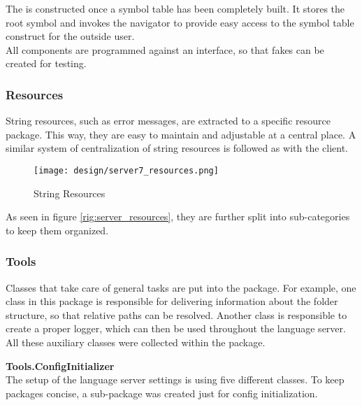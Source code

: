 The  is constructed once a symbol table has been completely built.
It stores the root symbol and invokes the navigator to provide easy access to the symbol table construct for the outside user.\\

All components are programmed against an interface, so that fakes can be created for testing.\\

\subsubsection{Resources}
String resources, such as error messages, are extracted to a specific resource package.
This way, they are easy to maintain and adjustable at a central place.
A similar system of centralization of string resources is followed as with the client.

\begin{figure}[h]
    \centering
    \texttt{[image: design/server7\_resources.png]}
    \caption{String Resources}
    \label{fig:server_resources}
\end{figure}

As seen in figure \ref{rig:server_resources}, they are further split into sub-categories to keep them organized.


\subsubsection{Tools}
Classes that take care of general tasks are put into the  package.
For example, one class in this package is responsible for delivering information about the folder structure, so that relative paths can be resolved.
Another class is responsible to create a proper logger, which can then be used throughout the language server.
All these auxiliary classes were collected within the  package.

\textbf{Tools.ConfigInitializer}\\

The setup of the language server settings is using five different classes.
To keep packages concise, a sub-package was created just for config initialization.\\

